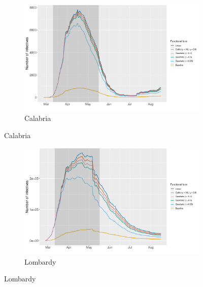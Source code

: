 \documentclass[12pt]{article}
\begin{document}
	\begin{figure}[H]
	    \centering
	    \begin{subfigure}{\textwidth}
	      \centering
	      \includegraphics[width=0.95\linewidth]{output/undocumented_comparison_CAL.pdf}
	      \caption{Calabria}
	      \label{fig:undoc_CAL}
	    \end{subfigure}
    \end{figure}
	\begin{figure}[H]\ContinuedFloat
	    \centering
	    \begin{subfigure}{\textwidth}
	      \centering
	      \includegraphics[width=0.95\linewidth]{output/undocumented_comparison_LOM.pdf}
	      \caption{Lombardy}
	      \label{fig:undoc_LOM}
	    \end{subfigure}
    \end{figure}
\end{document}
